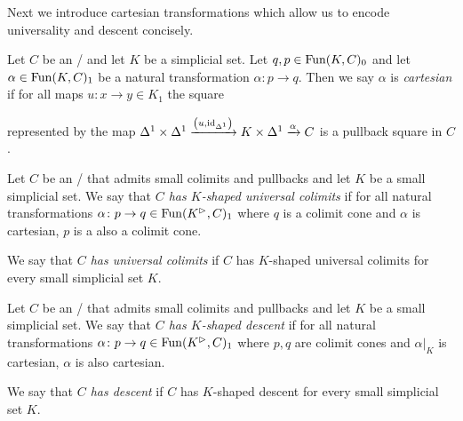Next we introduce cartesian transformations which allow us to encode universality and descent concisely.
\begin{definition}
    Let $C$ be an \inftycat/ and let $K$ be a simplicial set.
    Let $q,p\in\operatorname{Fun}(K,C)_0$ and let $\alpha\in\operatorname{Fun}(K,C)_1$ be a natural transformation $\alpha\colon p\to q$.
    Then we say $\alpha$ is \emph{cartesian} if for all maps $u\colon x\to y\in K_1$ the square 
    \begin{center}
    \end{center}
    represented by the map $\Delta^1\times\Delta^1\xrightarrow{\left(u,\text{id}_{\Delta^1}\right)}K\times\Delta^1\xrightarrow{\alpha}C$ is a pullback square in $C$. 
\end{definition}
\begin{definition}[Universality]
    Let $C$ be an \inftycat/ that admits small colimits and pullbacks and let $K$ be a small simplicial set.
    We say that \emph{$C$ has $K$-shaped universal colimits} if for all natural transformations $\alpha\colon p\to q\in\operatorname{Fun}(K^{\rhd},C)_1$ where $q$ is a colimit cone and $\alpha$ is cartesian, $p$ is a also a colimit cone.
    
    We say that \emph{$C$ has universal colimits} if $C$ has $K$-shaped universal colimits for every small simplicial set $K$.
\end{definition}
\begin{definition}[Descent]
    Let $C$ be an \inftycat/ that admits small colimits and pullbacks and let $K$ be a small simplicial set.
    We say that \emph{$C$ has $K$-shaped descent} if for all natural transformations $\alpha\colon p\to q\in\operatorname{Fun}(K^{\rhd},C)_1$ where $p,q$ are colimit cones and $\alpha|_K$ is cartesian, $\alpha$ is also cartesian.
    
    We say that \emph{$C$ has descent} if $C$ has $K$-shaped descent for every small simplicial set $K$.
\end{definition}
